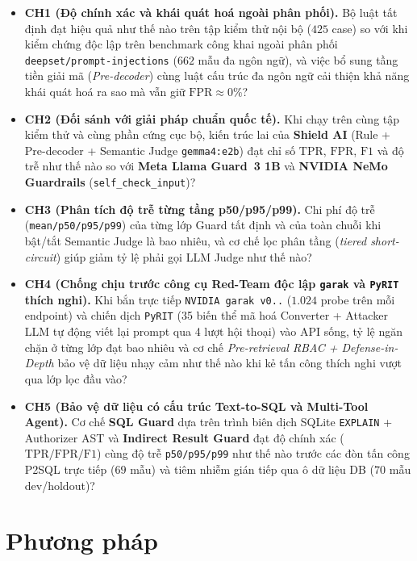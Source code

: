 \begin{itemize}
    \item \textbf{CH1 (Độ chính xác và khái quát hoá ngoài phân phối).} Bộ luật tất định đạt hiệu quả như thế nào trên tập kiểm thử nội bộ ($425$ case) so với khi kiểm chứng độc lập trên benchmark công khai ngoài phân phối \texttt{deepset/\allowbreak prompt-\allowbreak injections} ($662$ mẫu đa ngôn ngữ), và việc bổ sung tầng tiền giải mã (\emph{Pre-decoder}) cùng luật cấu trúc đa ngôn ngữ cải thiện khả năng khái quát hoá ra sao mà vẫn giữ $\text{FPR} \approx 0\%$?
    \item \textbf{CH2 (Đối sánh với giải pháp chuẩn quốc tế).} Khi chạy trên cùng tập kiểm thử và cùng phần cứng cục bộ, kiến trúc lai của \textbf{Shield AI} (Rule + Pre-decoder + Semantic Judge \texttt{gemma4:e2b}) đạt chỉ số $\text{TPR}$, $\text{FPR}$, $\text{F1}$ và độ trễ như thế nào so với \textbf{Meta Llama Guard~3 1B} và \textbf{NVIDIA NeMo Guardrails} (\texttt{self\_\allowbreak check\_\allowbreak input})?
    \item \textbf{CH3 (Phân tích độ trễ từng tầng p50/p95/p99).} Chi phí độ trễ (\texttt{mean/\allowbreak p50/\allowbreak p95/\allowbreak p99}) của từng lớp Guard tất định và của toàn chuỗi khi bật/tắt Semantic Judge là bao nhiêu, và cơ chế lọc phân tầng (\emph{tiered short-circuit}) giúp giảm tỷ lệ phải gọi LLM Judge như thế nào?
    \item \textbf{CH4 (Chống chịu trước công cụ Red-Team độc lập \texttt{garak} và \texttt{PyRIT} thích nghi).} Khi bắn trực tiếp \texttt{NVIDIA garak v0..} ($1.024$ probe trên mỗi endpoint) và chiến dịch \texttt{PyRIT} (35 biến thể mã hoá Converter + Attacker LLM tự động viết lại prompt qua 4 lượt hội thoại) vào API sống, tỷ lệ ngăn chặn ở từng lớp đạt bao nhiêu và cơ chế \emph{Pre-retrieval RBAC + Defense-in-Depth} bảo vệ dữ liệu nhạy cảm như thế nào khi kẻ tấn công thích nghi vượt qua lớp lọc đầu vào?
    \item \textbf{CH5 (Bảo vệ dữ liệu có cấu trúc Text-to-SQL và Multi-Tool Agent).} Cơ chế \textbf{SQL Guard} dựa trên trình biên dịch SQLite \texttt{EXPLAIN} + Authorizer AST và \textbf{Indirect Result Guard} đạt độ chính xác ($\text{TPR}/\text{FPR}/\text{F1}$) cùng độ trễ \texttt{p50/\allowbreak p95/\allowbreak p99} như thế nào trước các đòn tấn công P2SQL trực tiếp ($69$ mẫu) và tiêm nhiễm gián tiếp qua ô dữ liệu DB ($70$ mẫu dev/holdout)?
\end{itemize}

\section*{Phương pháp}

